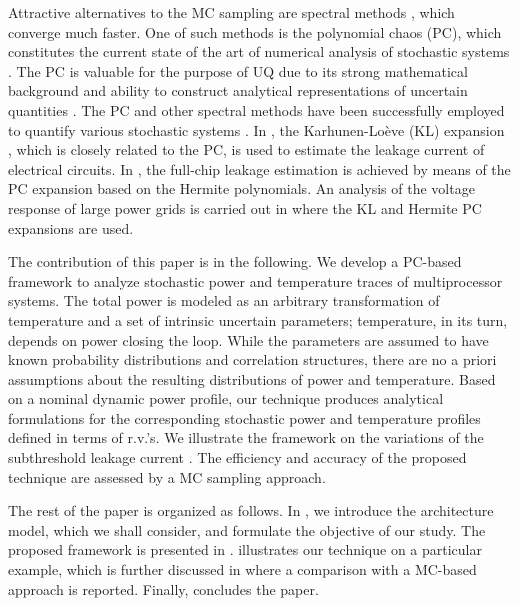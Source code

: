 Attractive alternatives to the MC sampling are spectral methods \cite{maitre2010}, which converge much faster. One of such methods is the polynomial chaos (PC), which constitutes the current state of the art of numerical analysis of stochastic systems \cite{xiu2009}. The PC is valuable for the purpose of UQ due to its strong mathematical background and ability to construct analytical representations of uncertain quantities \cite{eldred2009}. The PC and other spectral methods have been successfully employed to quantify various stochastic systems \cite{xiu2010}. In \cite{bhardwaj2006}, the Karhunen-Lo\`{e}ve (KL) expansion \cite{loeve1978}, which is closely related to the PC, is used to estimate the leakage current of electrical circuits. In \cite{shen2009}, the full-chip leakage estimation is achieved by means of the PC expansion based on the Hermite polynomials. An analysis of the voltage response of large power grids is carried out in \cite{ghanta2006} where the KL and Hermite PC expansions are used.

The contribution of this paper is in the following. We develop a PC-based framework to analyze stochastic power and temperature traces of multiprocessor systems. The total power is modeled as an arbitrary transformation of temperature and a set of intrinsic uncertain parameters; temperature, in its turn, depends on power closing the loop. While the parameters are assumed to have known probability distributions and correlation structures, there are no a priori assumptions about the resulting distributions of power and temperature. Based on a nominal dynamic power profile, our technique produces analytical formulations for the corresponding stochastic power and temperature profiles defined in terms of r.v.'s. We illustrate the framework on the variations of the subthreshold leakage current \cite{srivastava2010}. The efficiency and accuracy of the proposed technique are assessed by a MC sampling approach.

The rest of the paper is organized as follows. In , we introduce the architecture model, which we shall consider, and formulate the objective of our study. The proposed framework is presented in .  illustrates our technique on a particular example, which is further discussed in  where a comparison with a MC-based approach is reported. Finally,  concludes the paper.
